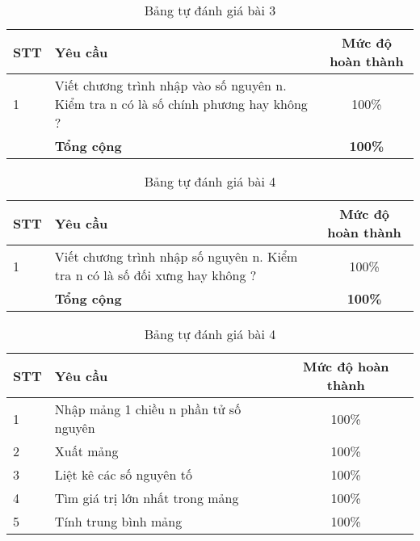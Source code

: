 \begin{center}
  \begin{table}[H]
    \centering
    \caption{Bảng tự đánh giá bài 3}
    \renewcommand{\arraystretch}{1.4}
    \begin{tabular}{|l|p{}|c|}
      \hline
      \textbf{STT} & \textbf{Yêu cầu}                                                                     & \textbf{Mức độ hoàn thành} \\ \hline
      1            & Viết chương trình nhập vào số nguyên n. Kiểm tra n có là số chính phương hay không ? & 100\%                      \\ \hline
                   & \textbf{Tổng cộng}                                                                   & \textbf{100\%}             \\ \hline
    \end{tabular}
    \label{tab:mytable}
  \end{table}


  \begin{table}[H]
    \centering
    \caption{Bảng tự đánh giá bài 4}
    \renewcommand{\arraystretch}{1.4}
    \begin{tabular}{|l|p{}|c|}
      \hline
      \textbf{STT} & \textbf{Yêu cầu}                                                             & \textbf{Mức độ hoàn thành} \\ \hline
      1            & Viết chương trình nhập số nguyên n. Kiểm tra n có là số đối xưng hay không ? & 100\%                      \\ \hline
                   & \textbf{Tổng cộng}                                                           & \textbf{100\%}             \\ \hline
    \end{tabular}
    \label{tab:mytable}
  \end{table}



  \begin{table}[H]
    \centering
    \caption{Bảng tự đánh giá bài 4}
    \renewcommand{\arraystretch}{1.4}
    \begin{tabular}{|l|p{}|c|}
      \hline
      \textbf{STT} & \textbf{Yêu cầu}                                         & \textbf{Mức độ hoàn thành} \\ \hline
      1            & Nhập mảng 1 chiều n phần tử số nguyên                    & 100\%                      \\ \hline
      2            & Xuất mảng                                                & 100\%                      \\ \hline
      3            & Liệt kê các số nguyên tố                                 & 100\%                      \\ \hline
      4            & Tìm giá trị lớn nhất trong mảng                          & 100\%                      \\ \hline
      5            & Tính trung bình mảng                                     & 100\%                      \\ \hline


\end{tabular}
\end{table}
\end{center}
